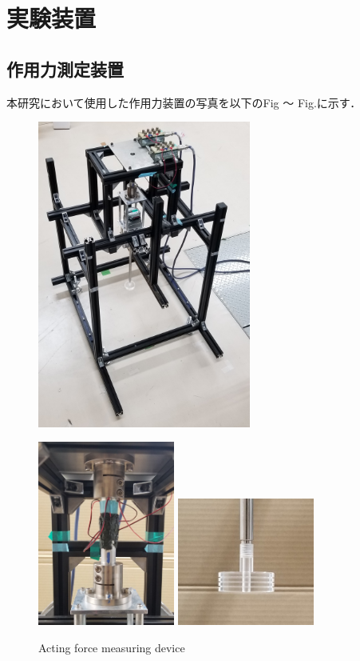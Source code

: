 \section{実験装置}

\subsection{作用力測定装置}
本研究において使用した作用力装置の写真を以下のFig ～ Fig.に示す．

\begin{figure}[htbp]
    \begin{minipage}[b]{0.48\linewidth}
        \centering
        \includegraphics[width=70mm]{images/21-1.png}
    \end{minipage}
    \begin{minipage}[b]{0.42\linewidth}
        \centering
        \includegraphics[width=45mm]{images/21-2.png}
        \includegraphics[width=45mm]{images/21-3.png}
    \end{minipage}
    \caption{Acting force measuring device}
\end{figure}

